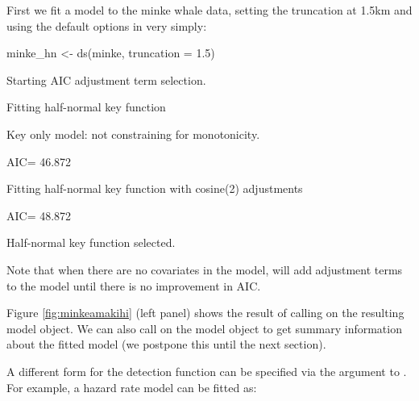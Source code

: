 \documentclass[article,shortnames]{jss}
\begin{document}
First we fit a model to the minke whale data, setting the truncation at
1.5km and using the default options in  very simply:

\begin{CodeChunk}
\begin{CodeInput}
minke_hn <- ds(minke, truncation = 1.5)
\end{CodeInput}
\begin{CodeOutput}
Starting AIC adjustment term selection.
\end{CodeOutput}
\begin{CodeOutput}
Fitting half-normal key function
\end{CodeOutput}
\begin{CodeOutput}
Key only model: not constraining for monotonicity.
\end{CodeOutput}
\begin{CodeOutput}
AIC= 46.872
\end{CodeOutput}
\begin{CodeOutput}
Fitting half-normal key function with cosine(2) adjustments
\end{CodeOutput}
\begin{CodeOutput}
AIC= 48.872
\end{CodeOutput}
\begin{CodeOutput}

Half-normal key function selected.
\end{CodeOutput}
\end{CodeChunk}

Note that when there are no covariates in the model,  will add
adjustment terms to the model until there is no improvement in AIC.

Figure \ref{fig:minkeamakihi} (left panel) shows the result of calling
 on the resulting model object. We can also call
 on the model object to get summary information about the
fitted model (we postpone this until the next section).

A different form for the detection function can be specified via the
 argument to . For example, a hazard rate model can
be fitted as:
\end{document}
